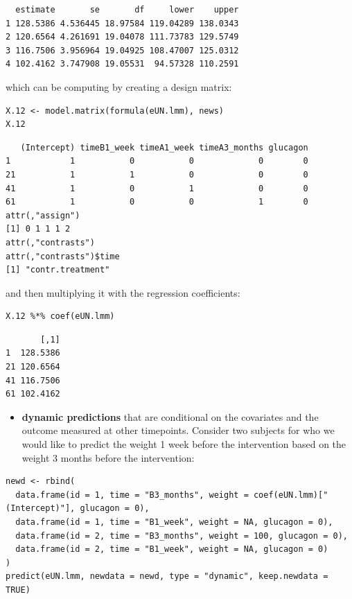 \documentclass[12pt]{article}
\begin{document}
\begin{verbatim}
  estimate       se       df     lower    upper
1 128.5386 4.536445 18.97584 119.04289 138.0343
2 120.6564 4.261691 19.04078 111.73783 129.5749
3 116.7506 3.956964 19.04925 108.47007 125.0312
4 102.4162 3.747908 19.05531  94.57328 110.2591
\end{verbatim}


which can be computing by creating a design matrix:
\lstset{language=r,label= ,caption= ,captionpos=b,numbers=none}
\begin{lstlisting}
X.12 <- model.matrix(formula(eUN.lmm), news)
X.12
\end{lstlisting}

\begin{verbatim}
   (Intercept) timeB1_week timeA1_week timeA3_months glucagon
1            1           0           0             0        0
21           1           1           0             0        0
41           1           0           1             0        0
61           1           0           0             1        0
attr(,"assign")
[1] 0 1 1 1 2
attr(,"contrasts")
attr(,"contrasts")$time
[1] "contr.treatment"
\end{verbatim}

and then multiplying it with the regression coefficients:
\lstset{language=r,label= ,caption= ,captionpos=b,numbers=none}
\begin{lstlisting}
X.12 %*% coef(eUN.lmm)
\end{lstlisting}

\begin{verbatim}
       [,1]
1  128.5386
21 120.6564
41 116.7506
61 102.4162
\end{verbatim}


\clearpage

\begin{itemize}
\item \textbf{dynamic predictions} that are conditional on the covariates and the
outcome measured at other timepoints. Consider two subjects for who
we would like to predict the weight 1 week before the intervention
based on the weight 3 months before the intervention:
\end{itemize}

\begin{lstlisting}
newd <- rbind(
  data.frame(id = 1, time = "B3_months", weight = coef(eUN.lmm)["(Intercept)"], glucagon = 0),
  data.frame(id = 1, time = "B1_week", weight = NA, glucagon = 0),
  data.frame(id = 2, time = "B3_months", weight = 100, glucagon = 0),
  data.frame(id = 2, time = "B1_week", weight = NA, glucagon = 0)
)
predict(eUN.lmm, newdata = newd, type = "dynamic", keep.newdata = TRUE)
\end{lstlisting}
\end{document}
